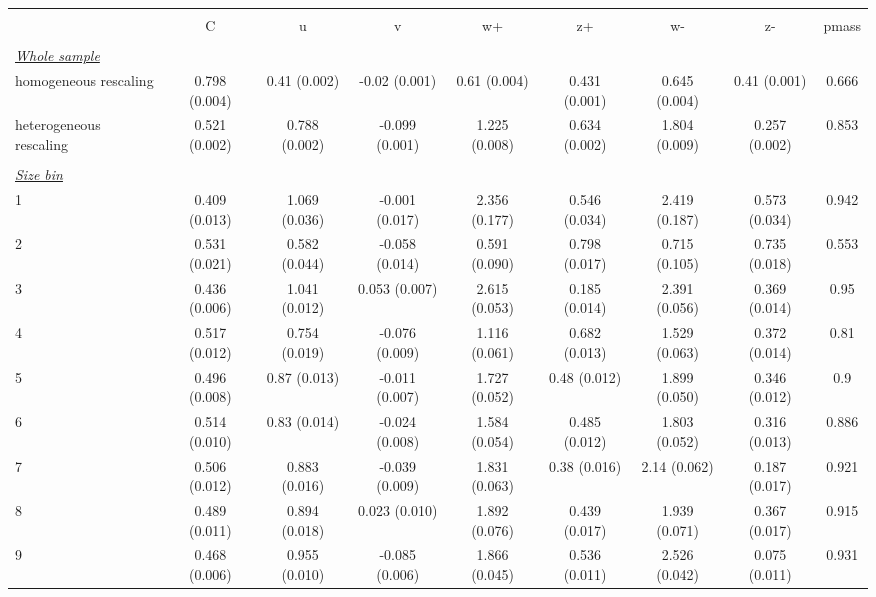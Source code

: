 
\begin{tabular}{@{\extracolsep{5pt}} l cccccccc} 
\\[-1.8ex]\hline 
\hline \\[-1.8ex] 
  & C & u & v & w+ & z+ & w- & z- & pmass \\ 
\hline \\[-1.8ex] 
\underline{{\it Whole sample}} &   &   &   &   &   &   &   &  \\ 
homogeneous rescaling & 0.798 (0.004) & 0.41 (0.002) & -0.02 (0.001) & 0.61 (0.004) & 0.431 (0.001) & 0.645 (0.004) & 0.41 (0.001) & 0.666 \\ 
heterogeneous rescaling & 0.521 (0.002) & 0.788 (0.002) & -0.099 (0.001) & 1.225 (0.008) & 0.634 (0.002) & 1.804 (0.009) & 0.257 (0.002) & 0.853 \\ 
 &   &   &   &   &   &   &   &  \\ 
\underline{{\it Size bin}} &   &   &   &   &   &   &   &  \\ 
1 & 0.409 (0.013) & 1.069 (0.036) & -0.001 (0.017) & 2.356 (0.177) & 0.546 (0.034) & 2.419 (0.187) & 0.573 (0.034) & 0.942 \\ 
2 & 0.531 (0.021) & 0.582 (0.044) & -0.058 (0.014) & 0.591 (0.090) & 0.798 (0.017) & 0.715 (0.105) & 0.735 (0.018) & 0.553 \\ 
3 & 0.436 (0.006) & 1.041 (0.012) & 0.053 (0.007) & 2.615 (0.053) & 0.185 (0.014) & 2.391 (0.056) & 0.369 (0.014) & 0.95 \\ 
4 & 0.517 (0.012) & 0.754 (0.019) & -0.076 (0.009) & 1.116 (0.061) & 0.682 (0.013) & 1.529 (0.063) & 0.372 (0.014) & 0.81 \\ 
5 & 0.496 (0.008) & 0.87 (0.013) & -0.011 (0.007) & 1.727 (0.052) & 0.48 (0.012) & 1.899 (0.050) & 0.346 (0.012) & 0.9 \\ 
6 & 0.514 (0.010) & 0.83 (0.014) & -0.024 (0.008) & 1.584 (0.054) & 0.485 (0.012) & 1.803 (0.052) & 0.316 (0.013) & 0.886 \\ 
7 & 0.506 (0.012) & 0.883 (0.016) & -0.039 (0.009) & 1.831 (0.063) & 0.38 (0.016) & 2.14 (0.062) & 0.187 (0.017) & 0.921 \\ 
8 & 0.489 (0.011) & 0.894 (0.018) & 0.023 (0.010) & 1.892 (0.076) & 0.439 (0.017) & 1.939 (0.071) & 0.367 (0.017) & 0.915 \\ 
9 & 0.468 (0.006) & 0.955 (0.010) & -0.085 (0.006) & 1.866 (0.045) & 0.536 (0.011) & 2.526 (0.042) & 0.075 (0.011) & 0.931 \\ 

\end{tabular}
